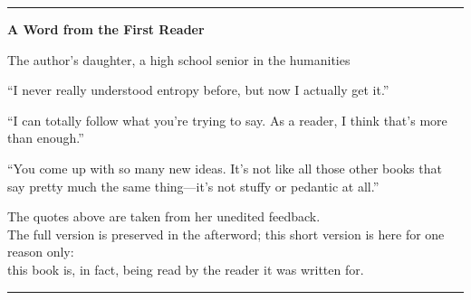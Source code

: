 \thispagestyle{empty}%
\color{black}%

\vspace*{16mm}

\begin{center}
    \rule{24mm}{0.4pt}

    \vspace{7mm}

    {\small\bfseries\color{black!78}A Word from the First Reader\par}

    \vspace{2.5mm}

    {\footnotesize\color{black!56}The author's daughter, a high school senior in the humanities\par}
\end{center}

\vspace{10mm}

\begin{myquote}


``I never really understood entropy before, but now I actually get it.''

\vspace{0.8em}

``I can totally follow what you're trying to say. As a reader, I think that's more than enough.''

\vspace{0.8em}

``You come up with so many new ideas. It's not like all those other books that say pretty much the same thing---it's not stuffy or pedantic at all.''
\end{myquote}

\vspace{3mm}

\begin{center}
    \parbox{0.82\textwidth}{%
        \centering
        \small\color{darkGray}
        The quotes above are taken from her unedited feedback.\\
        The full version is preserved in the afterword; this short version is here for one reason only:\\
        this book is, in fact, being read by the reader it was written for.
    }
\end{center}

\vfill

\begin{center}
    \rule{24mm}{0.4pt}
\end{center}

\clearpage
